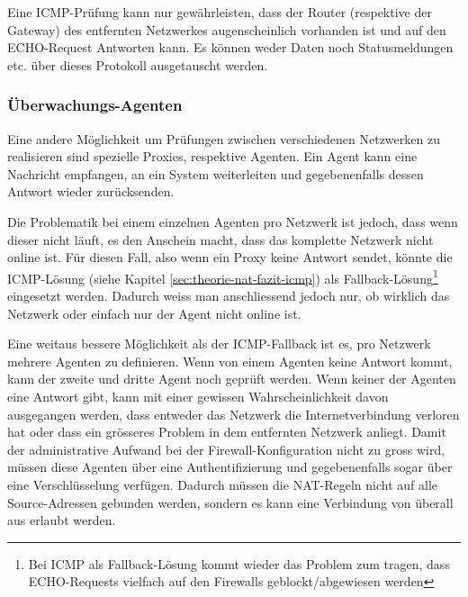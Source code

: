 Eine ICMP-Pr\"ufung kann nur gew\"ahrleisten, dass der Router (respektive der Gateway) des entfernten Netzwerkes augenscheinlich vorhanden ist und auf den ECHO-Request Antworten kann. Es k\"onnen weder Daten noch Statusmeldungen etc. \"uber dieses Protokoll ausgetauscht werden.

\subsubsection{\"Uberwachungs-Agenten} \label{sec:theorie-nat-fazit-proxy}
Eine andere M\"oglichkeit um Pr\"ufungen zwischen verschiedenen Netzwerken zu realisieren sind spezielle Proxies, respektive Agenten. Ein Agent kann eine Nachricht empfangen, an ein System weiterleiten und gegebenenfalls dessen Antwort wieder zur\"ucksenden.

Die Problematik bei einem einzelnen Agenten pro Netzwerk ist jedoch, dass wenn dieser nicht l\"auft, es den Anschein macht, dass das komplette Netzwerk nicht online ist. F\"ur diesen Fall, also wenn ein Proxy keine Antwort sendet, k\"onnte die ICMP-L\"osung (siehe Kapitel \ref{sec:theorie-nat-fazit-icmp}) als Fallback-L\"osung\footnote{Bei ICMP als Fallback-L\"osung kommt wieder das Problem zum tragen, dass ECHO-Requests vielfach auf den Firewalls geblockt/abgewiesen werden} eingesetzt werden. Dadurch weiss man anschliessend jedoch nur, ob wirklich das Netzwerk oder einfach nur der Agent nicht online ist.

Eine weitaus bessere M\"oglichkeit als der ICMP-Fallback ist es, pro Netzwerk mehrere Agenten zu definieren. Wenn von einem Agenten keine Antwort kommt, kann der zweite und dritte Agent noch gepr\"uft werden. Wenn keiner der Agenten eine Antwort gibt, kann mit einer gewissen Wahrscheinlichkeit davon ausgegangen werden, dass entweder das Netzwerk die Internetverbindung verloren hat oder dass ein gr\"osseres Problem in dem entfernten Netzwerk anliegt. Damit der administrative Aufwand bei der Firewall-Konfiguration nicht zu gross wird, m\"ussen diese Agenten \"uber eine Authentifizierung und gegebenenfalls sogar \"uber eine Verschl\"usselung verf\"ugen. Dadurch m\"ussen die NAT-Regeln nicht auf alle Source-Adressen gebunden werden, sondern es kann eine Verbindung von \"uberall aus erlaubt werden.

